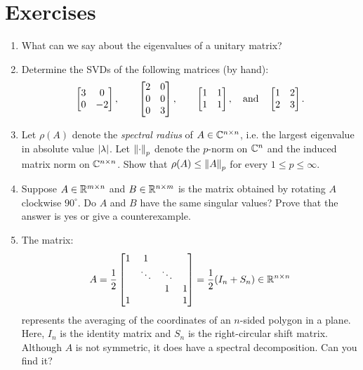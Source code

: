 \documentclass[11pt,letterpaper]{article}
\begin{document}
\section*{Exercises}

\begin{enumerate}

\item What can we say about the eigenvalues of a unitary matrix?

\item Determine the SVDs of the following matrices (by hand):
\[
\begin{bmatrix} 3 & 0\\ 0 & -2\end{bmatrix},\qquad \begin{bmatrix} 2 & 0\\ 0 & 0\\ 0 & 3\end{bmatrix},\qquad \begin{bmatrix} 1 & 1\\1 & 1\end{bmatrix},\quad{\rm and}\quad \begin{bmatrix} 1 & 2\\2 & 3\end{bmatrix}.
\]

\item Let $\rho(A)$ denote the {\em spectral radius} of $A\in\mathbb{C}^{n\times n}$, i.e. the largest eigenvalue in absolute value $\left|{\lambda}\right|$. Let $\left\|{\cdot}\right\|_p$ denote the $p$-norm on $\mathbb{C}^n$ and the induced matrix norm on $\mathbb{C}^{n\times n}$. Show that $\rho(A) \le \left\|{A}\right\|_p$ for every $1\le p\le\infty$.

\item Suppose $A\in\mathbb{R}^{m\times n}$ and $B\in\mathbb{R}^{n\times m}$ is the matrix obtained by rotating $A$ clockwise $90^{\circ}$. Do $A$ and $B$ have the same singular values? Prove that the answer is yes or give a counterexample.

\item The matrix:
\[
A = \frac{1}{2}\begin{bmatrix} 1 & 1\\ & \ddots & \ddots\\ & & 1 & 1\\ 1 & & & 1\\\end{bmatrix} = \frac{1}{2}(I_n+S_n)\in\mathbb{R}^{n\times n}
\]
represents the averaging of the coordinates of an $n$-sided polygon in a plane. Here, $I_n$ is the identity matrix and $S_n$ is the right-circular shift matrix. Although $A$ is not symmetric, it does have a spectral decomposition. Can you find it?


\end{enumerate}
\end{document}
